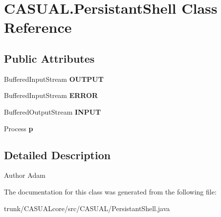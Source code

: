 \hypertarget{classCASUAL_1_1PersistantShell}{\section{C\-A\-S\-U\-A\-L.\-Persistant\-Shell Class Reference}
\label{classCASUAL_1_1PersistantShell}
}
\subsection*{Public Attributes}
\begin{DoxyCompactItemize}
\item 
\hypertarget{classCASUAL_1_1PersistantShell_ab71dba5558d1902db71c641c833c3307}{Buffered\-Input\-Stream {\bfseries O\-U\-T\-P\-U\-T}}\label{classCASUAL_1_1PersistantShell_ab71dba5558d1902db71c641c833c3307}

\item 
\hypertarget{classCASUAL_1_1PersistantShell_a2e86f1e4076660a4d4b9323e3e425adf}{Buffered\-Input\-Stream {\bfseries E\-R\-R\-O\-R}}\label{classCASUAL_1_1PersistantShell_a2e86f1e4076660a4d4b9323e3e425adf}

\item 
\hypertarget{classCASUAL_1_1PersistantShell_a94ada4d0d7be8f4feec9f185e5ad4cbf}{Buffered\-Output\-Stream {\bfseries I\-N\-P\-U\-T}}\label{classCASUAL_1_1PersistantShell_a94ada4d0d7be8f4feec9f185e5ad4cbf}

\item 
\hypertarget{classCASUAL_1_1PersistantShell_a41dfdd50182743df6820f9fb9c9e3213}{Process {\bfseries p}}\label{classCASUAL_1_1PersistantShell_a41dfdd50182743df6820f9fb9c9e3213}

\end{DoxyCompactItemize}


\subsection{Detailed Description}
\begin{DoxyAuthor}{Author}
Adam 
\end{DoxyAuthor}


The documentation for this class was generated from the following file\-:\begin{DoxyCompactItemize}
\item 
trunk/\-C\-A\-S\-U\-A\-Lcore/src/\-C\-A\-S\-U\-A\-L/Persistant\-Shell.\-java\end{DoxyCompactItemize}

